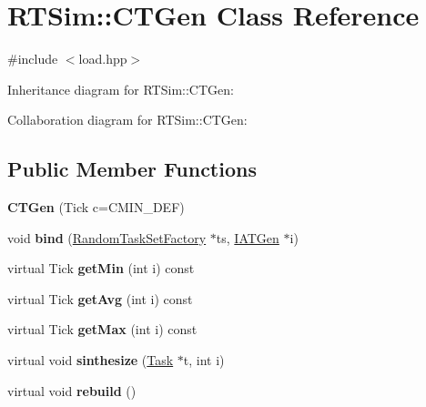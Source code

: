 \hypertarget{classRTSim_1_1CTGen}{}\section{R\+T\+Sim\+:\+:C\+T\+Gen Class Reference}
\label{classRTSim_1_1CTGen}


{\ttfamily \#include $<$load.\+hpp$>$}



Inheritance diagram for R\+T\+Sim\+:\+:C\+T\+Gen\+:


Collaboration diagram for R\+T\+Sim\+:\+:C\+T\+Gen\+:
\subsection*{Public Member Functions}
\begin{DoxyCompactItemize}
\item 
{\bfseries C\+T\+Gen} (Tick c=C\+M\+I\+N\+\_\+\+D\+EF)\hypertarget{classRTSim_1_1CTGen_a6c2b0d75030cd4b632560838792ae66a}{}\label{classRTSim_1_1CTGen_a6c2b0d75030cd4b632560838792ae66a}

\item 
void {\bfseries bind} (\hyperlink{classRTSim_1_1RandomTaskSetFactory}{Random\+Task\+Set\+Factory} $\ast$ts, \hyperlink{classRTSim_1_1IATGen}{I\+A\+T\+Gen} $\ast$i)\hypertarget{classRTSim_1_1CTGen_a46987193217869fed7bd29e3a7a98404}{}\label{classRTSim_1_1CTGen_a46987193217869fed7bd29e3a7a98404}

\item 
virtual Tick {\bfseries get\+Min} (int i) const \hypertarget{classRTSim_1_1CTGen_aaea46b3c7fb073511433b163b0ae4729}{}\label{classRTSim_1_1CTGen_aaea46b3c7fb073511433b163b0ae4729}

\item 
virtual Tick {\bfseries get\+Avg} (int i) const \hypertarget{classRTSim_1_1CTGen_a9fb4ab0bb47b3f4cfe577c91f2c03934}{}\label{classRTSim_1_1CTGen_a9fb4ab0bb47b3f4cfe577c91f2c03934}

\item 
virtual Tick {\bfseries get\+Max} (int i) const \hypertarget{classRTSim_1_1CTGen_a3b333b3df8c5f238397e672f7cf309b8}{}\label{classRTSim_1_1CTGen_a3b333b3df8c5f238397e672f7cf309b8}

\item 
virtual void {\bfseries sinthesize} (\hyperlink{classRTSim_1_1Task}{Task} $\ast$t, int i)\hypertarget{classRTSim_1_1CTGen_a3bd0f6d5979742a97bbff1ae4a54f02d}{}\label{classRTSim_1_1CTGen_a3bd0f6d5979742a97bbff1ae4a54f02d}

\item 
virtual void {\bfseries rebuild} ()\hypertarget{classRTSim_1_1CTGen_a545b1c1d9b34b48d763d3d8459d7bc4a}{}\label{classRTSim_1_1CTGen_a545b1c1d9b34b48d763d3d8459d7bc4a}

\end{DoxyCompactItemize}
